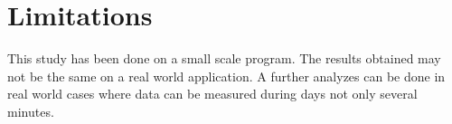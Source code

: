 \section{Limitations}
This study has been done on a small scale program. The results obtained may not be the same on a real world application.
A further analyzes can be done in real world cases where data can be measured during days not only several minutes.